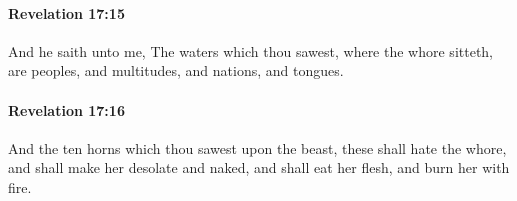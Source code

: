 		\paragraph{Revelation 17:15} %
			\label{REVELATIONNT-17-15}

			And he saith unto me, The waters which thou sawest, where the whore sitteth, are peoples, and multitudes, and nations, and tongues.

			\begin{framed}
			\scriptsize
				\begin{compactdesc}
					\item[SBLG] 
				\end{compactdesc}
			\end{framed}

		\paragraph{Revelation 17:16} %
			\label{REVELATIONNT-17-16}

			And the ten horns which thou sawest upon the beast, these shall hate the whore, and shall make her desolate and naked, and shall eat her flesh, and burn her with fire.

